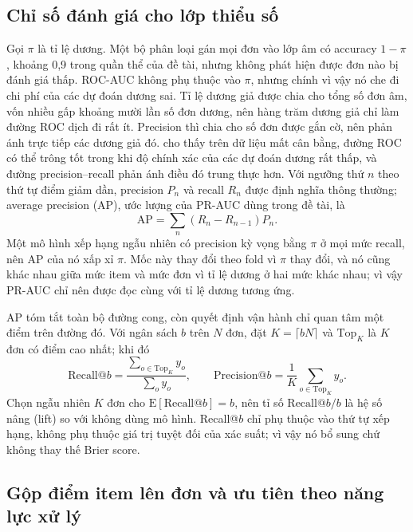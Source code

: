 \documentclass[12pt,a4paper]{report}
\begin{document}
\subsection{Chỉ số đánh giá cho lớp thiểu số}\label{sec:th-metrics}

Gọi $\pi$ là tỉ lệ dương. Một bộ phân loại gán mọi đơn vào lớp âm có accuracy $1-\pi$, khoảng 0,9 trong quần thể của đề tài, nhưng không phát hiện được đơn nào bị đánh giá thấp. ROC-AUC không phụ thuộc vào $\pi$, nhưng chính vì vậy nó che đi chi phí của các dự đoán dương sai. Tỉ lệ dương giả được chia cho tổng số đơn âm, vốn nhiều gấp khoảng mười lần số đơn dương, nên hàng trăm dương giả chỉ làm đường ROC dịch đi rất ít. Precision thì chia cho số đơn được gắn cờ, nên phản ánh trực tiếp các dương giả đó. \textcite{saito2015} cho thấy trên dữ liệu mất cân bằng, đường ROC có thể trông tốt trong khi độ chính xác của các dự đoán dương rất thấp, và đường precision--recall phản ánh điều đó trung thực hơn. Với ngưỡng thứ $n$ theo thứ tự điểm giảm dần, precision $P_n$ và recall $R_n$ được định nghĩa thông thường; average precision (AP), ước lượng của PR-AUC dùng trong đề tài, là
\begin{equation}\label{eq:th-ap}
  \mathrm{AP} = \sum_{n} \left( R_n - R_{n-1} \right) P_n .
\end{equation}
Một mô hình xếp hạng ngẫu nhiên có precision kỳ vọng bằng $\pi$ ở mọi mức recall, nên AP của nó xấp xỉ $\pi$. Mốc này thay đổi theo fold vì $\pi$ thay đổi, và nó cũng khác nhau giữa mức item và mức đơn vì tỉ lệ dương ở hai mức khác nhau; vì vậy PR-AUC chỉ nên được đọc cùng với tỉ lệ dương tương ứng.

AP tóm tắt toàn bộ đường cong, còn quyết định vận hành chỉ quan tâm một điểm trên đường đó. Với ngân sách $b$ trên $N$ đơn, đặt $K = \lceil bN \rceil$ và $\mathrm{Top}_K$ là $K$ đơn có điểm cao nhất; khi đó
\begin{equation}\label{eq:th-recallk}
  \mathrm{Recall@}b = \frac{\sum_{o \in \mathrm{Top}_K} y_o}{\sum_{o} y_o}, \qquad
  \mathrm{Precision@}b = \frac{1}{K} \sum_{o \in \mathrm{Top}_K} y_o .
\end{equation}
Chọn ngẫu nhiên $K$ đơn cho $\mathrm{E}[\mathrm{Recall@}b] = b$, nên tỉ số $\mathrm{Recall@}b / b$ là hệ số nâng (lift) so với không dùng mô hình. Recall@$b$ chỉ phụ thuộc vào thứ tự xếp hạng, không phụ thuộc giá trị tuyệt đối của xác suất; vì vậy nó bổ sung chứ không thay thế Brier score.

\subsection{Gộp điểm item lên đơn và ưu tiên theo năng lực xử lý}\label{sec:th-aggregation}
\end{document}
